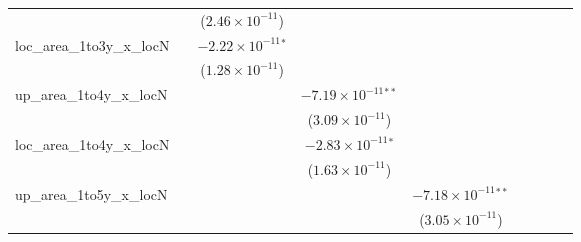 \begin{tabular}{lcccccccc}
                                 &                                & ($2.46\times 10^{-11}$)        &                                &                                &                                &                                &                                &   \\   
   loc\_area\_1to3y\_x\_locN     &                                & $-2.22\times 10^{-11}$$^{*}$   &                                &                                &                                &                                &                                &   \\   
                                 &                                & ($1.28\times 10^{-11}$)        &                                &                                &                                &                                &                                &   \\   
   up\_area\_1to4y\_x\_locN      &                                &                                & $-7.19\times 10^{-11}$$^{**}$  &                                &                                &                                &                                &   \\   
                                 &                                &                                & ($3.09\times 10^{-11}$)        &                                &                                &                                &                                &   \\   
   loc\_area\_1to4y\_x\_locN     &                                &                                & $-2.83\times 10^{-11}$$^{*}$   &                                &                                &                                &                                &   \\   
                                 &                                &                                & ($1.63\times 10^{-11}$)        &                                &                                &                                &                                &   \\   
   up\_area\_1to5y\_x\_locN      &                                &                                &                                & $-7.18\times 10^{-11}$$^{**}$  &                                &                                &                                &   \\   
                                 &                                &                                &                                & ($3.05\times 10^{-11}$)        &                                &                                &                                &   \\   

\end{tabular}
